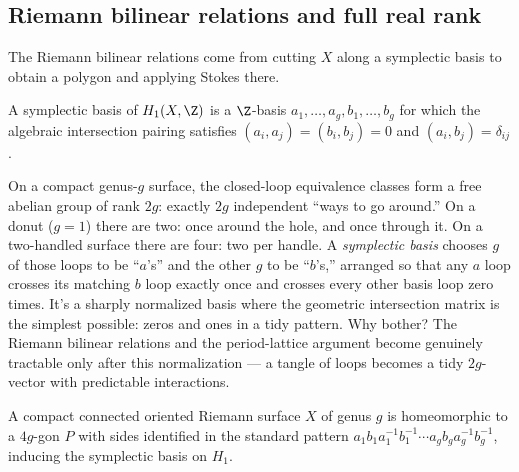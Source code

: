 \subsection{Riemann bilinear relations and full real rank}

The Riemann bilinear relations come from cutting \(X\) along a
symplectic basis to obtain a polygon and applying Stokes there.

\begin{definition}
\label{def:symplectic-basis}
A symplectic basis of \(H_1(X,\Z)\) is a \(\Z\)-basis
\(a_1,\dots,a_g,b_1,\dots,b_g\) for which the algebraic intersection
pairing satisfies
\((a_i,a_j)=(b_i,b_j)=0\) and \((a_i,b_j)=\delta_{ij}\).
\leanok
\end{definition}

\begin{layman}
On a compact genus-\(g\) surface, the closed-loop equivalence classes
form a free abelian group of rank \(2g\): exactly \(2g\) independent
``ways to go around.'' On a donut (\(g = 1\)) there are two: once
around the hole, and once through it. On a two-handled surface there
are four: two per handle. A \emph{symplectic basis} chooses \(g\) of
those loops to be ``\(a\)'s'' and the other \(g\) to be ``\(b\)'s,''
arranged so that any \(a\) loop crosses its matching \(b\) loop exactly
once and crosses every other basis loop zero times. It's a sharply
normalized basis where the geometric intersection matrix is the
simplest possible: zeros and ones in a tidy pattern. Why bother? The
Riemann bilinear relations and the period-lattice argument become
genuinely tractable only after this normalization — a tangle of loops
becomes a tidy \(2g\)-vector with predictable interactions.
\end{layman}

\begin{theorem}
\label{thm:polygonal-model}
A compact connected oriented Riemann surface \(X\) of genus \(g\) is
homeomorphic to a \(4g\)-gon \(P\) with sides identified in the
standard pattern \(a_1b_1a_1^{-1}b_1^{-1}\cdots a_gb_ga_g^{-1}b_g^{-1}\),
inducing the symplectic basis on \(H_1\).
\notready
\end{theorem}

